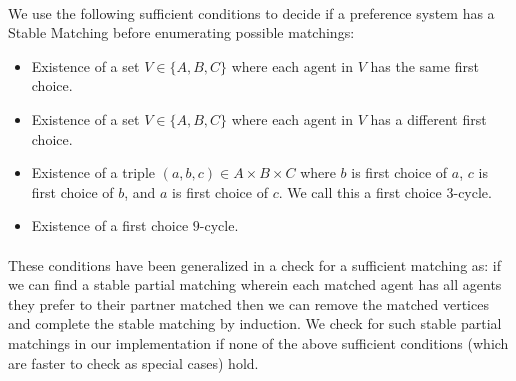 \documentclass[letterpaper,12pt,oneside,onecolumn]{article}
\begin{document}
\paragraph{}
We use the following sufficient conditions to decide if a preference system has a Stable Matching before enumerating possible matchings:
\begin{itemize}
\item Existence of a set $V \in \{A,B,C\}$ where each agent in $V$ has the same first choice.
\item Existence of a set $V \in \{A,B,C\}$ where each agent in $V$ has a different first choice.
\item Existence of a triple $(a,b,c) \in A\times B\times C$ where $b$ is first choice of $a$, $c$ is first choice of $b$, and $a$ is first choice of $c$. We call this a first choice $3$-cycle.
\item Existence of a first choice $9$-cycle.
\end{itemize}
\paragraph{}
These conditions have been generalized in a check for a sufficient matching as: if we can find a stable partial matching wherein each matched agent has all agents they prefer to their partner matched then we can remove the matched vertices and complete the stable matching by induction. We check for such stable partial matchings in our implementation if none of the above sufficient conditions (which are faster to check as special cases) hold.
\end{document}
